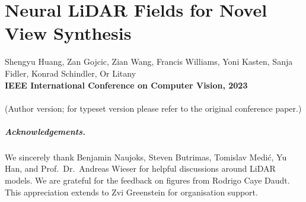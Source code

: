 \chapter[Neural LiDAR Fields for Novel View Synthesis]{Neural LiDAR Fields for Novel View Synthesis}
\label{chap:iccv23}

Shengyu Huang, Zan Gojcic, Zian Wang, Francis Williams, Yoni Kasten, Sanja Fidler, Konrad Schindler, Or Litany\\
\textbf{IEEE International Conference on Computer Vision, 2023}\\
\\
(Author version; for typeset version please refer to the original conference paper.)\\

\providecommand{\subdir}{.}
\graphicspath{{\subdir/}}


\newpage







\paragraph{Acknowledgements.}
{We sincerely thank Benjamin Naujoks, Steven Butrimas, Tomislav Medić, Yu Han, and Prof.~Dr.~Andreas Wieser for helpful discussions around LiDAR models. We are grateful for the feedback on figures from Rodrigo Caye Daudt. This appreciation extends to Zvi Greenstein for organisation support.}


\newpage
\newcommand{\manuallabel}[2]{\def\@currentlabel{#2}\label{#1}}
\makeatother
\manuallabel{eq:loss_function}{Eq.~(15)}

